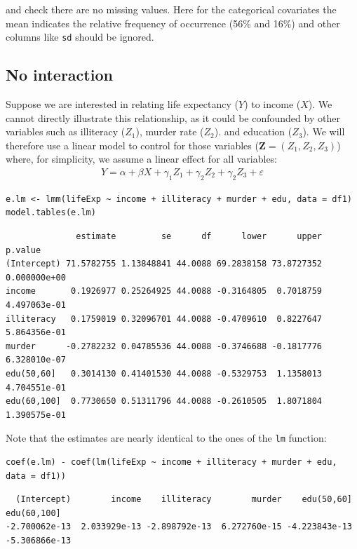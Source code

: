 \documentclass[12pt]{article}
\newcommand{\VZ}{\boldsymbol{Z}}
\begin{document}
and check there are no missing values. Here for the categorical
covariates the mean indicates the relative frequency of occurrence
(56\% and 16\%) and other columns like \texttt{sd} should be ignored.

\subsection{No interaction}
\label{sec:orgc75f255}

Suppose we are interested in relating life expectancy (\(Y\)) to
income (\(X\)). We cannot directly illustrate this relationship, as it
could be confounded by other variables such as illiteracy (\(Z_1\)),
murder rate (\(Z_2\)). and education (\(Z_3\)). We will therefore use
a linear model to control for those variables (\(\VZ=(Z_1,Z_2,Z_3)\))
where, for simplicity, we assume a linear effect for all variables:
\begin{align*}
Y = \alpha + \beta X + \gamma_1 Z_1 + \gamma_2 Z_2 + \gamma_2 Z_3 + \varepsilon
\end{align*}
\lstset{language=r,label= ,caption= ,captionpos=b,numbers=none}
\begin{lstlisting}
e.lm <- lmm(lifeExp ~ income + illiteracy + murder + edu, data = df1)
model.tables(e.lm)
\end{lstlisting}

\begin{verbatim}
              estimate         se      df      lower      upper      p.value
(Intercept) 71.5782755 1.13848841 44.0088 69.2838158 73.8727352 0.000000e+00
income       0.1926977 0.25264925 44.0088 -0.3164805  0.7018759 4.497063e-01
illiteracy   0.1759019 0.32096701 44.0088 -0.4709610  0.8227647 5.864356e-01
murder      -0.2782232 0.04785536 44.0088 -0.3746688 -0.1817776 6.328010e-07
edu(50,60]   0.3014130 0.41401530 44.0088 -0.5329753  1.1358013 4.704551e-01
edu(60,100]  0.7730650 0.51311796 44.0088 -0.2610505  1.8071804 1.390575e-01
\end{verbatim}


Note that the estimates are nearly identical to the ones of the \texttt{lm}
function:
\lstset{language=r,label= ,caption= ,captionpos=b,numbers=none}
\begin{lstlisting}
coef(e.lm) - coef(lm(lifeExp ~ income + illiteracy + murder + edu, data = df1))
\end{lstlisting}

\begin{verbatim}
  (Intercept)        income    illiteracy        murder    edu(50,60]   edu(60,100] 
-2.700062e-13  2.033929e-13 -2.898792e-13  6.272760e-15 -4.223843e-13 -5.306866e-13
\end{verbatim}
\end{document}
